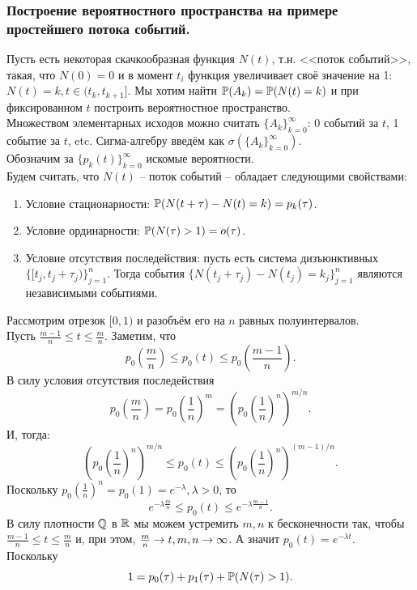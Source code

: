 \subsubsection{Построение вероятностного пространства на примере простейшего потока событий.}
Пусть есть некоторая скачкообразная функция $N(t)$, т.н. <<поток событий>>, такая, что $N(0) = 0$ и в момент $t_i$ функция увеличивает своё значение на 1: $N(t) = k, t \in (t_k, t_{k + 1}]$. 
Мы хотим найти $\P(A_k) = \P(N(t) = k)$ и при фиксированном $t$ построить вероятностное пространство.  \\
Множеством элементарных исходов можно считать $\{A_k\}_{k = 0}^{\infty}$: 0 событий за $t$, 1 событие за $t$, etc. Сигма-алгебру введём как $\sigma(\{A_k\}_{k = 0}^{\infty})$. \\
Обозначим за $\{p_k(t)\}_{k = 0}^{\infty}$ искомые вероятности. \\
Будем считать, что $N(t)$ -- поток событий -- обладает следующими свойствами:
\begin{enumerate}
    \item Условие стационарности: $\P(N(t + \tau) - N(t) = k) = p_k(\tau)$.
    \item Условие ординарности: $\P(N(\tau) > 1) = o(\tau)$.
    \item Условие отсутствия последействия: пусть есть система дизъюнктивных $\{[t_j, t_j + \tau_j)\}_{j = 1}^{n}$. Тогда события $\{N(t_j  + \tau_j) - N(t_j) = k_j\}_{j = 1}^n$ являются независимыми событиями.
\end{enumerate}
Рассмотрим отрезок $[0, 1)$ и разобъём его на $n$ равных полуинтервалов. \\
Пусть $\frac{m - 1}{n} \leq t \leq \frac{m}{n}$. Заметим, что
\[
    p_0\left(\frac{m}{n}\right) \leq p_0(t) \leq p_0\left(\frac{m - 1}{n}\right).
\]
В силу условия отсутствия последействия 
\[
    p_0\left(\frac{m}{n}\right) = p_0\left(\dfrac{1}{n}\right)^m = \left(p_0\left(\dfrac{1}{n}\right)^n\right)^{m/n}.
\]
И, тогда:
\[
    \left(p_0\left(\dfrac{1}{n}\right)^n\right)^{m/n} \leq p_0(t) \leq \left(p_0\left(\dfrac{1}{n}\right)^n\right)^{(m - 1)/n}.
\]
Поскольку $p_0\left(\frac{1}{n}\right)^n = p_0(1) = e^{-\lambda}, \lambda > 0$, то 
\[
    e^{-\lambda \frac{m}{n}} \leq p_0(t) \leq e^{-\lambda \frac{m - 1}{n}}.
\]
В силу плотности $\Q$ в $\R$ мы можем устремить $m, n$ к бесконечности так, чтобы $\frac{m - 1}{n} \leq t \leq \frac{m}{n}$ и, при этом, $\frac{m}{n} \ra t, m, n \ra \infty$. А значит $p_0(t) = e^{-\lambda t}$. \\
Поскольку 
\[
1 = p_0(\tau) + p_1(\tau) + \P(N(\tau) > 1).
\]
